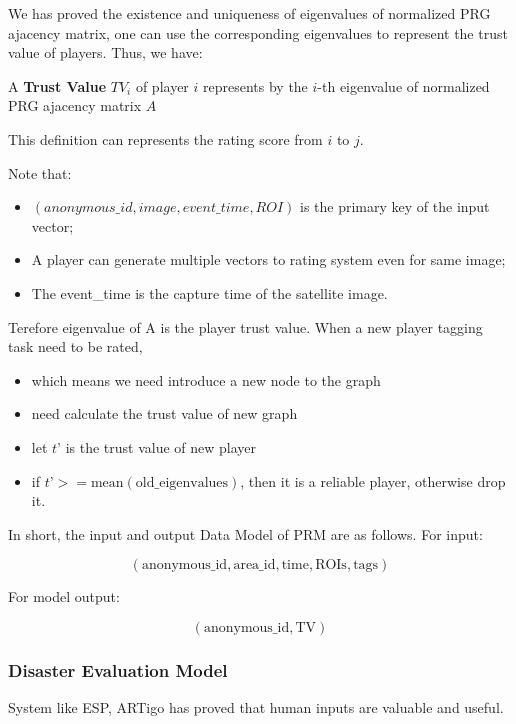   We has proved the existence and uniqueness of eigenvalues of normalized PRG ajacency matrix, 
  one can use the corresponding eigenvalues to represent the trust value of players. Thus, we have:

  \begin{definition}
  A \textbf{Trust Value} $TV_i$ of player $i$ represents by the $i$-th eigenvalue of normalized PRG ajacency matrix $A$
  \end{definition}

  This definition can represents the rating score from $i$ to $j$.
  
  Note that:

  \begin{itemize}
    \item $(anonymous\_id, image, event\_time, ROI)$ is the primary key of the input vector;
    \item A player can generate multiple vectors to rating system even for same image;
    \item The event\_time is the capture time of the satellite image.
  \end{itemize}

  Terefore eigenvalue of A is the player trust value. When a new player tagging task need to be rated,

  \begin{itemize}
    \item which means we need introduce a new node to the graph
    \item need calculate the trust value of new graph
    \item let $t’$ is the trust value of new player
    \item if $t’ >= \text{mean}(\text{old\_eigenvalues})$, then it is a reliable player, otherwise drop it.
  \end{itemize}

  In short, the input and output Data Model of PRM are as follows. For input:

  \[
    (\text{anonymous\_id}, \text{area\_id}, \text{time}, \text{ROIs}, \text{tags})
  \]

  For model output: 
  
  \[
  (\text{anonymous\_id}, \text{TV})
  \]

  \subsubsection{Disaster Evaluation Model}

  System like ESP\cite{von2004labeling}, ARTigo\cite{wieser2013artigo} has proved that 
  human inputs are valuable and useful.

